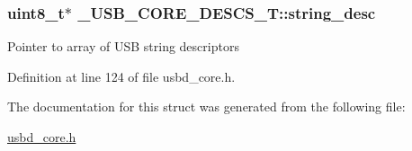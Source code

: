 \subsubsection[{\texorpdfstring{string\+\_\+desc}{string_desc}}]{\setlength{\rightskip}{0pt plus 5cm}uint8\+\_\+t$\ast$ \+\_\+\+U\+S\+B\+\_\+\+C\+O\+R\+E\+\_\+\+D\+E\+S\+C\+S\+\_\+\+T\+::string\+\_\+desc}\hypertarget{struct__USB__CORE__DESCS__T_af785297629e79dec58480668d005c04e}{}\label{struct__USB__CORE__DESCS__T_af785297629e79dec58480668d005c04e}
Pointer to array of U\+SB string descriptors 

Definition at line 124 of file usbd\+\_\+core.\+h.



The documentation for this struct was generated from the following file\+:\begin{DoxyCompactItemize}
\item 
\hyperlink{usbd__core_8h}{usbd\+\_\+core.\+h}\end{DoxyCompactItemize}

